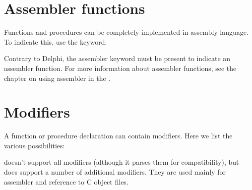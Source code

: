 \section{Assembler functions}
Functions and procedures can be completely implemented in assembly
language. To indicate this, use the  keyword:

Contrary to Delphi, the assembler keyword must be present to indicate an
assembler function.
For more information about assembler functions, see the chapter on using
assembler in the \progref.


\section{Modifiers}
A function or procedure declaration can contain modifiers. Here we list the
various possibilities:

\fpc doesn't support all \tp modifiers (although it parses them for
compatibility), but does support a number of additional modifiers.
They are used mainly for assembler and reference to C object files.


